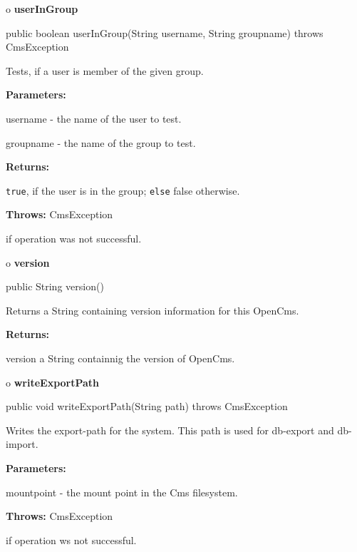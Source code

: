 o {\bf userInGroup} 

\begin{PRE}
 public boolean userInGroup(String username,
                            String groupname) throws CmsException
\end{PRE}

\begin{description}
\htmlDD Tests, if a user is member of the given group. 

\begin{description}
\item {\bf Parameters:}  

username - the name of the user to test.  

groupname - the name of the group to test.  
\item {\bf Returns:}  

{\tt true}, if the user is in the group; {\tt else} false otherwise.  
\item {\bf Throws:} CmsException  

if operation was not successful.  
\end{description}

\end{description}

o {\bf version} 

\begin{PRE}
 public String version()
\end{PRE}

\begin{description}
\htmlDD Returns a String containing version information for this OpenCms. 

\begin{description}
\item {\bf Returns:}  

version a String containnig the version of OpenCms.  
\end{description}

\end{description}

o {\bf writeExportPath} 

\begin{PRE}
 public void writeExportPath(String path) throws CmsException
\end{PRE}

\begin{description}
\htmlDD Writes the export-path for the system. \htmlBR
This path is used for db-export and db-import. 

\begin{description}
\item {\bf Parameters:}  

mountpoint - the mount point in the Cms filesystem.  
\item {\bf Throws:} CmsException  

if operation ws not successful.  
\end{description}

\end{description}

